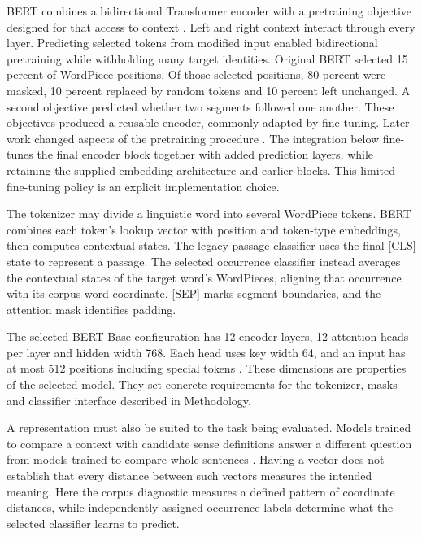 \documentclass[10pt,letterpaper]{article}
\begin{document}
BERT combines a bidirectional Transformer encoder with a pretraining objective designed for that access to context \cite{bert}. Left and right context interact through every layer. Predicting selected tokens from modified input enabled bidirectional pretraining while withholding many target identities. Original BERT selected 15 percent of WordPiece positions. Of those selected positions, 80 percent were masked, 10 percent replaced by random tokens and 10 percent left unchanged. A second objective predicted whether two segments followed one another. These objectives produced a reusable encoder, commonly adapted by fine-tuning. Later work changed aspects of the pretraining procedure \cite{roberta}. The integration below fine-tunes the final encoder block together with added prediction layers, while retaining the supplied embedding architecture and earlier blocks. This limited fine-tuning policy is an explicit implementation choice.\par

The tokenizer may divide a linguistic word into several WordPiece tokens. BERT combines each token's lookup vector with position and token-type embeddings, then computes contextual states. The legacy passage classifier uses the final [CLS] state to represent a passage. The selected occurrence classifier instead averages the contextual states of the target word's WordPieces, aligning that occurrence with its corpus-word coordinate. [SEP] marks segment boundaries, and the attention mask identifies padding.\par

The selected BERT Base configuration has 12 encoder layers, 12 attention heads per layer and hidden width 768. Each head uses key width 64, and an input has at most 512 positions including special tokens \cite{bert}. These dimensions are properties of the selected model. They set concrete requirements for the tokenizer, masks and classifier interface described in Methodology.\par

A representation must also be suited to the task being evaluated. Models trained to compare a context with candidate sense definitions answer a different question from models trained to compare whole sentences \cite{glossbert,sbert}. Having a vector does not establish that every distance between such vectors measures the intended meaning. Here the corpus diagnostic measures a defined pattern of coordinate distances, while independently assigned occurrence labels determine what the selected classifier learns to predict.\par
\end{document}
